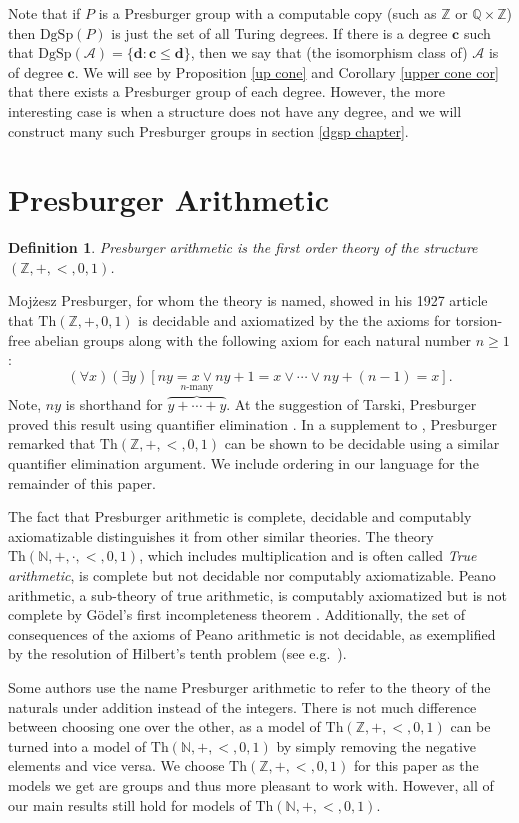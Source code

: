 \documentclass{amsart}%
\numberwithin{theorem}{section}
\newtheorem{definition}[theorem]{Definition}
\newcommand{\Th}{\text{Th}}
\newcommand{\Q}{\mathbb{Q}}
\newcommand{\Z}{\mathbb{Z}}
\newcommand{\N}{\mathbb{N}}
\newcommand{\A}{\mathcal{A}}
\newcommand{\0}{\emptyset}
\newcommand{\ccc}{\boldsymbol{c}}
\newcommand{\ddd}{\boldsymbol{d}}
\newcommand{\E}{\exists}
\newcommand{\dgsp}{\text{DgSp}}
\begin{document}
Note that if $P$ is a Presburger group with a computable copy (such as $\Z$ or $\Q\times \Z$) then $\dgsp(P)$ is just the set of all Turing degrees. If there is a degree $\ccc$ such that $\dgsp(\A)=\{\ddd:\ccc\leq \ddd\}$, then we say that (the isomorphism class of) $\A$ is of degree $\ccc$. We will see by Proposition \ref{up cone} and Corollary \ref{upper cone cor} that there exists a Presburger group of each degree. However, the more interesting case is when a structure does not have any degree, and we will construct many such Presburger groups in section \ref{dgsp chapter}.    


\section{Presburger Arithmetic}

\begin{definition}
    Presburger arithmetic is the first order theory of the structure $(\Z,+,<,0,1)$. 
\end{definition}

Moj\.zesz Presburger, for whom the theory is named, showed in his 1927 article \cite{Presburger} that $\Th(\Z,+,0,1)$ is decidable and axiomatized by the the axioms for torsion-free abelian groups along with the following axiom for each natural number $n\geq1$: 
$$(\forall x)(\E y)[ny=x \vee ny+1 = x \vee \cdots \vee ny + (n-1) = x].$$ Note, $ny$ is shorthand for $\overbrace{y+\cdots+y}^{\text{$n$-many}}$.
At the suggestion of Tarski, Presburger proved this result using quantifier elimination \cite{Haase}. In a supplement to \cite{Presburger}, Presburger remarked that $\Th(\Z, +, <, 0,1)$ can be shown to be decidable using a similar quantifier elimination argument.  We include ordering in our language for the remainder of this paper. 

The fact that Presburger arithmetic is complete, decidable and computably axiomatizable distinguishes it from other similar theories. The theory $\Th(\N,+,\cdot,<,0,1)$, which includes multiplication and is often called \emph{True arithmetic}, is complete but not decidable nor computably axiomatizable. Peano arithmetic, a sub-theory of true arithmetic, is computably axiomatized but is not complete by G\"odel's first incompleteness theorem \cite{Godel}. Additionally, the set of consequences of the axioms of Peano arithmetic is not decidable, as exemplified by the resolution of Hilbert's tenth problem (see e.g.\ \cite{cooper}). 

Some authors use the name Presburger arithmetic to refer to the theory of the naturals under addition instead of the integers. There is not much difference between choosing one over the other, as a model of $\Th(\Z,+,<,0,1)$ can be turned into a model of $\Th(\N,+,<,0,1)$ by simply removing the negative elements and vice versa. We choose $\Th(\Z,+,<,0,1)$ for this paper as the models we get are groups and thus more pleasant to work with. However, all of our main results still hold for models of $\Th(\N,+,<,0,1)$. 
\end{document}
